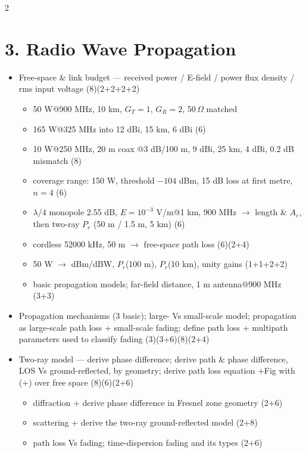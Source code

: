 \documentclass[10pt]{article}
\begin{document}
\begin{multicols}{2}
\section*{3. Radio Wave Propagation}
\begin{itemize}
  \item Free-space \& link budget --- received power / E-field / power flux density / rms input voltage \hfill (8)(2+2+2+2)
    \begin{itemize}
      \item 50 W@900 MHz, 10 km, $G_T{=}1$, $G_R{=}2$, 50\,$\Omega$ matched
      \item 165 W@325 MHz into 12 dBi, 15 km, 6 dBi \hfill (6)
      \item 10 W@250 MHz, 20 m coax @3 dB/100 m, 9 dBi, 25 km, 4 dBi, 0.2 dB mismatch \hfill (8)
      \item coverage range: 150 W, threshold $-104$ dBm, 15 dB loss at first metre, $n{=}4$ \hfill (6)
      \item $\lambda/4$ monopole 2.55 dB, $E{=}10^{-3}$ V/m@1 km, 900 MHz $\rightarrow$ length \& $A_e$, then two-ray $P_r$ (50 m / 1.5 m, 5 km) \hfill (6)
      \item cordless 52000 kHz, 50 m $\rightarrow$ free-space path loss \hfill (6)(2+4)
      \item 50 W $\rightarrow$ dBm/dBW, $P_r$(100 m), $P_r$(10 km), unity gains \hfill (1+1+2+2)
      \item basic propagation models; far-field distance, 1 m antenna@900 MHz \hfill (3+3)
    \end{itemize}
  \item Propagation mechanisms (3 basic); large- Vs small-scale model; propagation as large-scale path loss + small-scale fading; define path loss + multipath parameters used to classify fading \hfill (3)(3+6)(8)(2+4)
  \item Two-ray model --- derive phase difference; derive path \& phase difference, LOS Vs ground-reflected, by geometry; derive path loss equation +Fig with (+) over free space \hfill (8)(6)(2+6)
    \begin{itemize}
      \item diffraction + derive phase difference in Fresnel zone geometry \hfill (2+6)
      \item scattering + derive the two-ray ground-reflected model \hfill (2+8)
      \item path loss Vs fading; time-dispersion fading and its types \hfill (2+6)
    \end{itemize}

\end{itemize}
\end{multicols}
\end{document}
